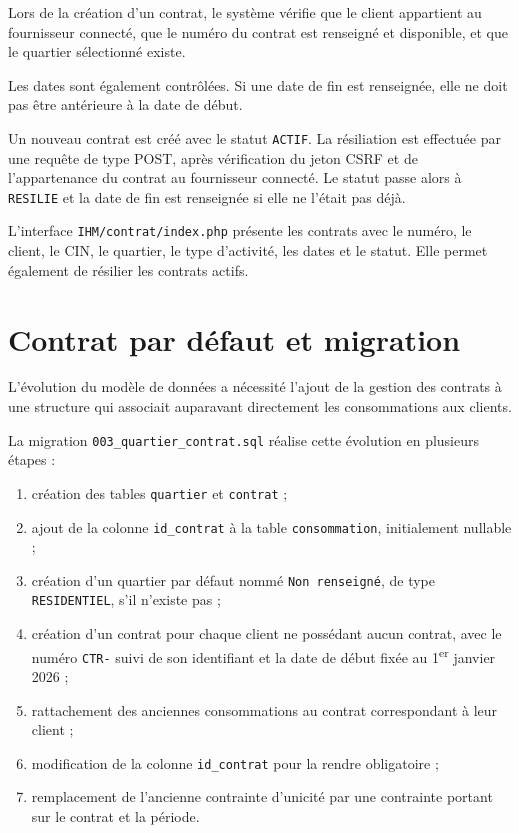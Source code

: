 Lors de la création d'un contrat, le système vérifie que le client appartient au fournisseur connecté, que le numéro du contrat est renseigné et disponible, et que le quartier sélectionné existe.

Les dates sont également contrôlées. Si une date de fin est renseignée, elle ne doit pas être antérieure à la date de début.

Un nouveau contrat est créé avec le statut \texttt{ACTIF}. La résiliation est effectuée par une requête de type POST, après vérification du jeton CSRF et de l'appartenance du contrat au fournisseur connecté. Le statut passe alors à \texttt{RESILIE} et la date de fin est renseignée si elle ne l'était pas déjà.

L'interface \texttt{IHM/contrat/index.php} présente les contrats avec le numéro, le client, le CIN, le quartier, le type d'activité, les dates et le statut. Elle permet également de résilier les contrats actifs.

\section{Contrat par défaut et migration}

L'évolution du modèle de données a nécessité l'ajout de la gestion des contrats à une structure qui associait auparavant directement les consommations aux clients.

La migration \texttt{003\_quartier\_contrat.sql} réalise cette évolution en plusieurs étapes :

\begin{enumerate}
    \item création des tables \texttt{quartier} et \texttt{contrat} ;
    \item ajout de la colonne \texttt{id\_contrat} à la table \texttt{consommation}, initialement nullable ;
    \item création d'un quartier par défaut nommé \texttt{Non renseigné}, de type \texttt{RESIDENTIEL}, s'il n'existe pas ;
    \item création d'un contrat pour chaque client ne possédant aucun contrat, avec le numéro \texttt{CTR-} suivi de son identifiant et la date de début fixée au 1\textsuperscript{er} janvier 2026 ;
    \item rattachement des anciennes consommations au contrat correspondant à leur client ;
    \item modification de la colonne \texttt{id\_contrat} pour la rendre obligatoire ;
    \item remplacement de l'ancienne contrainte d'unicité par une contrainte portant sur le contrat et la période.
\end{enumerate}

